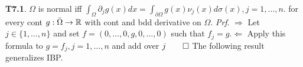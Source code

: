 {\bf T7.1}. $\Omega$ is normal iff $\int_{\Omega} \partial_j g(x) dx = \int_{\partial \Omega} g(x) \nu_j (x) d \sigma(x), j = 1, \dots, n$. for every cont $g: \bar{\Omega} \rightarrow \mathbb{R}$ with cont and bdd derivative on $\Omega$. {\it Prf}. $\Rightarrow$ Let $j \in \{1, \dots, n\}$ and set $f = (0, \dots, 0, g, 0, \dots, 0)$ such that $f_j = g. \Leftarrow$ Apply this formula to $g = f_j, j = 1, \dots, n$ and add over $j \qed$ The following result generalizes IBP. 
